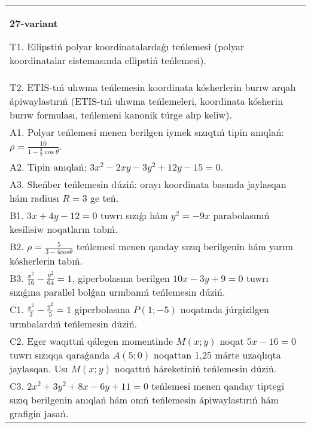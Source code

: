 \documentclass{article}
\begin{document}
\begin{tabular}{m{17cm}}
\textbf{27-variant}
\newline

T1. Ellipstiń polyar koordinatalardaǵı teńlemesi (polyar koordinatalar sistemasında ellipstiń teńlemesi).\\

T2. ETIS-tıń ulıwma teńlemesin koordinata kósherlerin burıw arqalı ápiwaylastırıń (ETIS-tıń ulıwma teńlemeleri, koordinata kósherin burıw formulası, teńlemeni kanonik túrge alıp keliw).\\

A1. Polyar teńlemesi menen berilgen iymek sızıqtıń tipin anıqlań: $\rho=\frac{10}{1-\frac{3}{2}\cos\theta}$.\\

A2. Tipin anıqlań: $3 x^{2}-2 xy-3 y^{2}+12 y-15=0$.\\

A3. Sheńber teńlemesin dúziń: orayı koordinata basında jaylasqan hám radiusı $R=3$ ge teń.\\

B1. $3x + 4y - 12 = 0$ tuwrı sızıǵı hám $y^{2} = - 9x$ parabolasınıń kesilisiw noqatların tabıń.  \\

B2. $\rho = \frac{5}{3 - 4cos\theta}$ teńlemesi menen qanday sızıq berilgenin hám yarım kósherlerin tabıń.  \\

B3. $\frac{x^{2}}{16} - \frac{y^{2}}{64} = 1$, giperbolasına berilgen $10x - 3y + 9 = 0$ tuwrı sızıǵına parallel bolǵan urınbanıń teńlemesin dúziń.  \\

C1. $\frac{x^{2}}{3} - \frac{y^{2}}{5} = 1$ giperbolasına $P(1; - 5)$ noqatında júrgizilgen urınbalardıń teńlemesin dúziń.\\

C2. Eger waqıttıń qálegen momentinde $M(x;y)$ noqat $5x - 16 = 0$ tuwrı sızıqqa qaraǵanda $A(5;0)$ noqattan 1,25 márte uzaqlıqta jaylasqan. Usı $M(x;y)$ noqattıń háreketiniń teńlemesin dúziń.  \\

C3. $2x^{2} + 3y^{2} + 8x - 6y + 11 = 0$ teńlemesi menen qanday tiptegi sızıq berilgenin anıqlań hám onıń teńlemesin ápiwaylastırıń hám grafigin jasań.  \\

\end{tabular}
\vspace{1cm}
\end{document}

